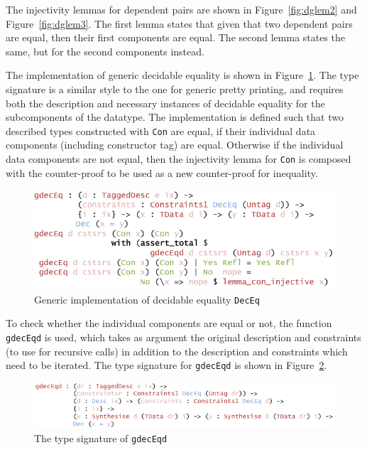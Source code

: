 \documentclass{ituthesis}
\newcommand{\ttconstructor}[1]{\textcolor{constructor-color}{\texttt{#1}}}
\newcommand{\tttype}[1]{\textcolor{type-color}{\texttt{#1}}}
\newcommand{\ttdec}[1]{\textcolor{declared-var-color}{\texttt{#1}}}
\theoremstyle{break}
\begin{document}
The injectivity lemmas for dependent pairs are shown in Figure~\ref{fig:dglem2} and Figure~\ref{fig:dglem3}.
The first lemma states that given that two dependent pairs are equal, then their first components are equal.
The second lemma states the same, but for the second components instead.

The implementation of generic decidable equality is shown in Figure~\ref{fig:deceqgen}.
The type signature is a similar style to the one for generic pretty printing, and requires both the description
and necessary instances of decidable equality for the subcomponents of the datatype.
The implementation is defined such that two described types constructed with \ttconstructor{Con} are equal, if their individual data components (including constructor tag) are equal.
Otherwise if the individual data components are not equal, then the injectivity lemma for \ttconstructor{Con} is composed with the counter-proof to be used as a new counter-proof for inequality.

\begin{figure}[ht]
\begin{center}
    \includegraphics[scale=0.5]{Figures/GenericDecEq.png}
\end{center}
\caption{Generic implementation of decidable equality \tttype{DecEq}}
\label{fig:deceqgen}
\end{figure}

To check whether the individual components are equal or not, the function \ttdec{gdecEqd} is used, which takes as argument the original description and constraints (to use for recursive calls)
in addition to the description and constraints which need to be iterated.
The type signature for \ttdec{gdecEqd} is shown in Figure~\ref{fig:deceqgendescty}.

\begin{figure}[ht]
\begin{center}
    \includegraphics[scale=0.5]{Figures/GenericDecEqDescType.png}
\end{center}
\caption{The type signature of \ttdec{gdecEqd}}
\label{fig:deceqgendescty}
\end{figure}
\end{document}
